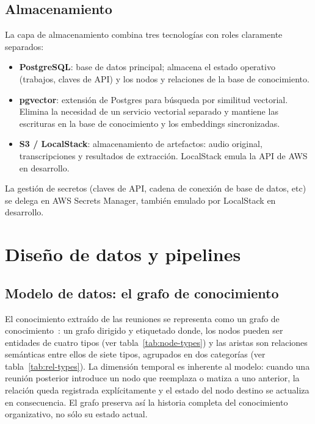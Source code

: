 \subsection{Almacenamiento}

La capa de almacenamiento combina tres tecnologías con roles claramente separados:

\begin{itemize}
  \item \textbf{PostgreSQL}: base de datos principal; almacena el estado operativo (trabajos,
        claves de \ac{API}) y los nodos y relaciones de la base de conocimiento.
  \item \textbf{pgvector}: extensión de Postgres para búsqueda por similitud vectorial. Elimina
        la necesidad de un servicio vectorial separado y mantiene las escrituras en la base de
        conocimiento y los embeddings sincronizadas.
  \item \textbf{S3 / LocalStack}: almacenamiento de artefactos: audio original, transcripciones
        y resultados de extracción. LocalStack emula la \ac{API} de AWS en desarrollo.
\end{itemize}

La gestión de secretos (claves de \ac{API}, cadena de conexión de base de datos, etc) se delega en AWS
Secrets Manager, también emulado por LocalStack en desarrollo.

\section{Diseño de datos y pipelines}

\subsection{Modelo de datos: el grafo de conocimiento}

El conocimiento extraído de las reuniones se representa como un grafo de
conocimiento~\cite{hogan2021knowledge}: un grafo dirigido y etiquetado donde, los nodos pueden ser
entidades de cuatro tipos (ver tabla~\ref{tab:node-types}) y las aristas son relaciones semánticas
entre ellos de siete tipos, agrupados en dos categorías (ver tabla~\ref{tab:rel-types}). La dimensión
temporal es inherente al modelo: cuando una reunión posterior introduce un nodo que reemplaza o matiza
a uno anterior, la relación queda registrada explícitamente y el estado del nodo destino se actualiza
en consecuencia. El grafo preserva así la historia completa del conocimiento organizativo, no sólo su
estado actual.

